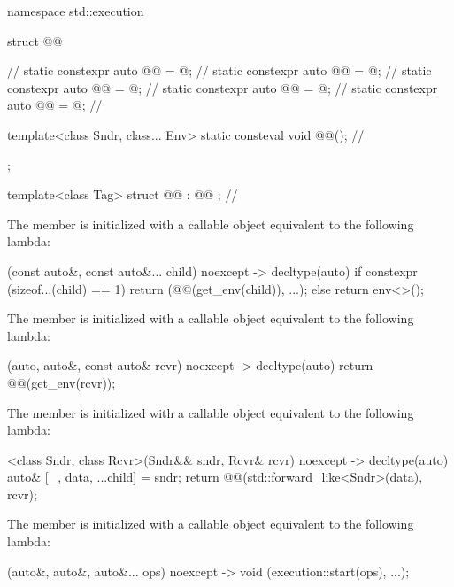 \pnum
\begin{codeblock}
namespace std::execution {
  struct @@ {                                        // \expos
    static constexpr auto @@ = @\seebelownc@;                // \expos
    static constexpr auto @@ = @\seebelownc@;                  // \expos
    static constexpr auto @@ = @\seebelownc@;                // \expos
    static constexpr auto @@ = @\seebelownc@;                    // \expos
    static constexpr auto @@ = @\seebelownc@;                 // \expos

    template<class Sndr, class... Env>
      static consteval void @@();                      // \expos
  };

  template<class Tag>
  struct @@ : @@ {};                          // \expos
}
\end{codeblock}

\pnum
The member 
is initialized with a callable object equivalent to the following lambda:
\begin{codeblock}
[](const auto&, const auto&... child) noexcept -> decltype(auto) {
  if constexpr (sizeof...(child) == 1)
    return (@@(get_env(child)), ...);
  else
    return env<>();
}
\end{codeblock}

\pnum
The member 
is initialized with a callable object equivalent to the following lambda:
\begin{codeblock}
[](auto, auto&, const auto& rcvr) noexcept -> decltype(auto) {
  return @@(get_env(rcvr));
}
\end{codeblock}

\pnum
The member 
is initialized with a callable object equivalent to the following lambda:
\begin{codeblock}
[]<class Sndr, class Rcvr>(Sndr&& sndr, Rcvr& rcvr) noexcept -> decltype(auto) {
  auto& [_, data, ...child] = sndr;
  return @@(std::forward_like<Sndr>(data), rcvr);
}
\end{codeblock}

\pnum
The member 
is initialized with a callable object equivalent to the following lambda:
\begin{codeblock}
[](auto&, auto&, auto&... ops) noexcept -> void {
  (execution::start(ops), ...);
}
\end{codeblock}

